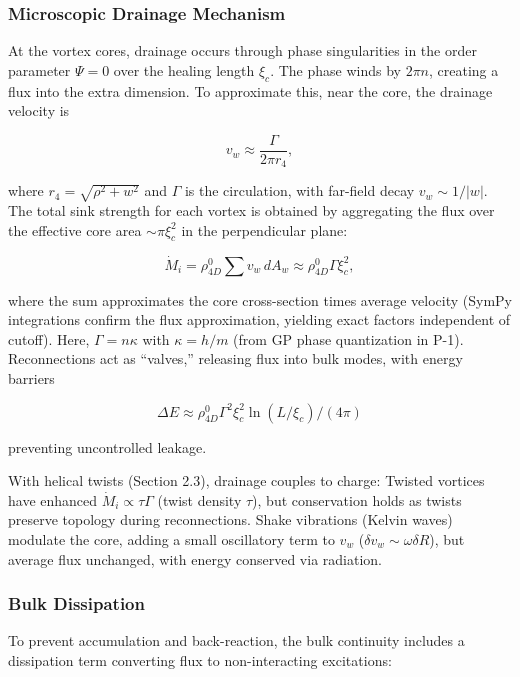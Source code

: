\subsubsection{Microscopic Drainage Mechanism}
At the vortex cores, drainage occurs through phase singularities in the order parameter $\Psi=0$ over the healing length $\xi_c$. The phase winds by $2\pi n$, creating a flux into the extra dimension. To approximate this, near the core, the drainage velocity is

\begin{equation}
v_w \approx \frac{\Gamma}{2\pi r_4},
\end{equation}

where $r_4 = \sqrt{\rho^2 + w^2}$ and $\Gamma$ is the circulation, with far-field decay $v_w \sim 1/|w|$. The total sink strength for each vortex is obtained by aggregating the flux over the effective core area $\sim \pi \xi_c^2$ in the perpendicular plane:

\begin{equation}
\dot{M}_i = \rho_{4D}^0 \sum v_w \, dA_w \approx \rho_{4D}^0 \Gamma \xi_c^2,
\end{equation}

where the sum approximates the core cross-section times average velocity (SymPy integrations confirm the flux approximation, yielding exact factors independent of cutoff). Here, $\Gamma = n \kappa$ with $\kappa = h / m$ (from GP phase quantization in P-1). Reconnections act as ``valves,'' releasing flux into bulk modes, with energy barriers

\begin{equation}
\Delta E \approx \rho_{4D}^0 \Gamma^2 \xi_c^2 \ln(L / \xi_c) / (4\pi)
\end{equation}

preventing uncontrolled leakage.

With helical twists (Section 2.3), drainage couples to charge: Twisted vortices have enhanced $\dot{M}_i \propto \tau \Gamma$ (twist density $\tau$), but conservation holds as twists preserve topology during reconnections. Shake vibrations (Kelvin waves) modulate the core, adding a small oscillatory term to $v_w$ ($\delta v_w \sim \omega \delta R$), but average flux unchanged, with energy conserved via radiation.

\subsubsection{Bulk Dissipation}
To prevent accumulation and back-reaction, the bulk continuity includes a dissipation term converting flux to non-interacting excitations:

